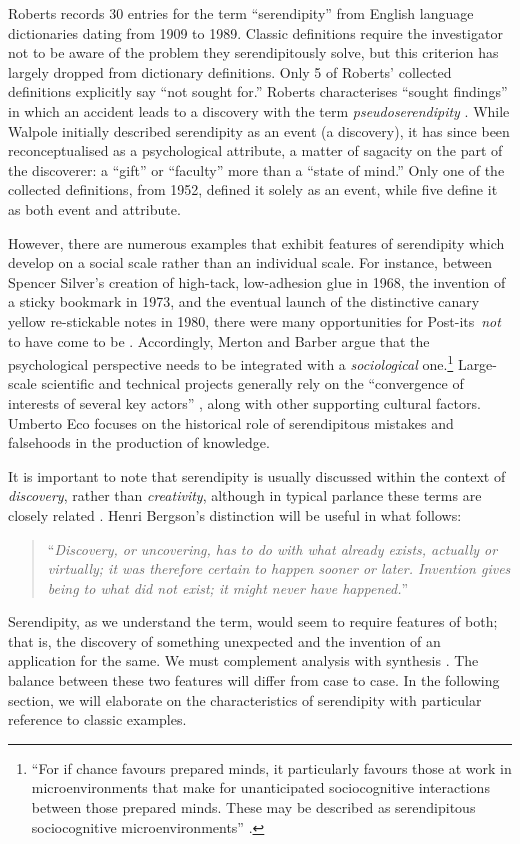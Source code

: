 \documentclass{llncs}
\begin{document}
Roberts \cite[pp. 246--249]{roberts} records 30 entries for the term ``serendipity'' from English language dictionaries dating from 1909 to 1989.  
%
Classic definitions require the investigator not to be aware of the problem they serendipitously solve, but this criterion has largely dropped from dictionary definitions. Only 5 of Roberts' collected definitions explicitly say ``not sought for.''  Roberts characterises ``sought findings'' in which an accident leads to a discovery with the term \emph{pseudoserendipity} \cite{chumaceiro1995serendipity}.
%
While Walpole initially described serendipity as an event (a discovery), it has since been reconceptualised as a psychological attribute, a matter of sagacity on the part of the discoverer: a ``gift'' or ``faculty'' more than a ``state of mind.''  Only one of the collected definitions, from 1952, defined it solely as an event, while five define it as both event and attribute.

However, there are numerous examples that exhibit features of
serendipity which develop on a social scale rather than an individual
scale.  For instance, between Spencer Silver's creation of high-tack,
low-adhesion glue in 1968, the invention of a sticky bookmark in 1973,
and the eventual launch of the distinctive canary yellow re-stickable
notes in 1980, there were many opportunities for
Post-its\texttrademark\ \emph{not} to have come to be
\cite{tce-postits}. Accordingly, Merton and Barber argue that the
psychological perspective needs to be integrated with a
\emph{sociological} one.\footnote{ ``For if chance favours prepared
  minds, it particularly favours those at work in microenvironments
  that make for unanticipated sociocognitive interactions between
  those prepared minds. These may be described as serendipitous
  sociocognitive microenvironments'' \cite[p. 259--260]{merton}.}
Large-scale scientific and technical projects generally rely on the
``convergence of interests of several key actors''
\cite{companions-in-geography}, along with other supporting cultural
factors.  Umberto Eco \cite{eco2013serendipities} focuses on the
historical role of serendipitous mistakes and falsehoods in the
production of knowledge.

It is important to note that serendipity is usually discussed within
the context of \emph{discovery}, rather than \emph{creativity},
although in typical parlance these terms are closely related
\cite{jordanous12jims}.  Henri Bergson's distinction will be useful in
what follows:
\begin{quote}
``\emph{Discovery, or uncovering, has to do with what already exists,
    actually or virtually; it was therefore certain to happen sooner
    or later.  Invention gives being to what did not exist; it might
    never have happened.}''~\cite{bergson2010creative}
\end{quote}
Serendipity, as we understand the term, would seem to require features
of both; that is, the discovery of something unexpected and the
invention of an application for the same.  We must complement analysis
with synthesis \cite{delanda1993virtual}.  The balance between these
two features will differ from case to case.  In the following section,
we will elaborate on the characteristics of serendipity with
particular reference to classic examples.
\end{document}
